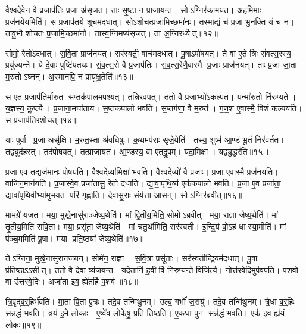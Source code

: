 वै॒श्व॒दे॒वेन॒ वै प्र॒जाप॑तिः प्र॒जा अ॑सृजत।
ताः सृ॒ष्टा न प्राजा॑यन्त।
सोऽग्निर॑कामयत।
अ॒हमि॒माः प्रज॑नयेय॒मिति॑।
स प्र॒जाप॑तये॒ शुच॑मदधात्।
सो॑ऽशोचत्प्र॒जामि॒च्छमा॑नः।
तस्मा॒द्यं च॑ प्र॒जा भु॒नक्ति॒ यं च॒ न।
तावु॒भौ शो॑चतः प्र॒जामि॒च्छमा॑नौ।
तास्व॒ग्निमप्य॑सृजत्।
ता अ॒ग्निरध्यैत्॥१२॥

सोमो॒ रेतो॑ऽदधात्।
स॒वि॒ता प्राज॑नयत्।
सर॑स्वती॒ वाच॑मदधात्।
पू॒षाऽपो॑षयत्।
ते वा ए॒ते त्रिः सं॑वत्स॒रस्य॒ प्रयु॑ज्यन्ते।
ये दे॒वाः पुष्टि॑पतयः।
सं॒व॒त्स॒रो वै प्र॒जाप॑तिः।
सं॒व॒त्स॒रेणै॒वास्मै प्र॒जाः प्राज॑नयत्।
ताः प्र॒जा जा॒ता म॒रुतोऽघ्नन्।
अ॒स्मानपि॒ न प्रायु॑क्ष॒तेति॑॥१३॥

स ए॒तं प्र॒जाप॑तिर्मारु॒त स॒प्तक॑पालमपश्यत्।
तन्निर॑वपत्।
ततो॒ वै प्र॒जाभ्यो॑ऽकल्पत।
यन्मा॑रु॒तो नि॑रु॒प्यते।
य॒ज्ञस्य॒ कॢप्त्यै।
प्र॒जाना॒मघा॑ताय।
स॒प्तक॑पालो भवति।
स॒प्तग॑णा॒ वै म॒रुत॑।
ग॒ण॒श ए॒वास्मै॒ विशं॑ कल्पयति।
स प्र॒जाप॑तिरशोचत्॥१४॥

याः पूर्वा प्र॒जा असृ॑क्षि।
म॒रुत॒स्ता अ॑वधिषुः।
क॒थमप॑राः सृजे॒येति॑।
तस्य॒ शुष्म॑ आ॒ण्डं भू॒तं निर॑वर्तत।
तद्व्युद॑हरत्।
तद॑पोषयत्।
तत्प्राजा॑यत।
आ॒ण्डस्य॒ वा ए॒तद्रू॒पम्।
यदा॒मिक्षा।
यद्व्यु॒द्धर॑ति॥१५॥

प्र॒जा ए॒व तद्यज॑मानः पोषयति।
वै॒श्व॒दे॒व्या॑मिक्षा॑ भवति।
वै॒श्व॒दे॒व्यो॑ वै प्र॒जाः।
प्र॒जा ए॒वास्मै॒ प्रज॑नयति।
वाजि॑न॒मान॑यति।
प्र॒जास्वे॒व प्रजा॑तासु॒ रेतो॑ दधाति।
द्या॒वा॒पृ॒थि॒व्य॑ एक॑कपालो भवति।
प्र॒जा ए॒व प्रजा॑ता॒ द्यावा॑पृथि॒वीभ्या॑मुभ॒यत॒ परि॑ गृह्णाति।
दे॒वा॒सु॒राः संय॑त्ता आसन्।
सोऽग्निर॑ब्रवीत्॥१६॥

मामग्रे॑ यजत।
मया॒ मुखे॒नासु॑राञ्जेष्य॒थेति॑।
मां द्वि॒तीय॒मिति॒ सोमोऽब्रवीत्।
मया॒ राज्ञा॑ जेष्य॒थेति॑।
मां तृ॒तीय॒मिति॑ सवि॒ता।
मया॒ प्रसू॑ता जेष्य॒थेति॑।
मां च॑तु॒र्थीमिति॒ सर॑स्वती।
इ॒न्द्रि॒यं वो॒ऽहं धास्या॒मीति॑।
मां प॑ञ्च॒ममिति॑ पू॒षा।
मया प्रति॒ष्ठया॑ जेष्य॒थेति॑॥१७॥

तेऽग्निना॒ मुखे॒नासु॑रानजयन्।
सोमे॑न॒ राज्ञा।
स॒वि॒त्रा प्रसू॑ताः।
सर॑स्वतीन्द्रि॒यम॑दधात्।
पू॒षा प्र॑ति॒ष्ठाऽऽसीत्।
ततो॒ वै दे॒वा व्य॑जयन्त।
यदे॒तानि॑ ह॒वीषि॑ निरु॒प्यन्ते॒ विजि॑त्यै।
नोत्त॑रवे॒दिमुप॑वपति।
प॒शवो॒ वा उ॑त्तरवे॒दिः।
अजा॑ता इव॒ ह्ये॑तर्\mbox{}हि॑ प॒शव॑॥१८॥\anuvakamend[ऐ॒दित्य॑शोचद्व्यु॒द्धर॑त्यब्रवीत्प्रति॒ष्ठया॑ जेष्य॒थेत्ये॒तर्\mbox{}हि॑ प॒शव॑]

त्रि॒वृद्ब॒र्॒हिर्भ॑वति।
मा॒ता पि॒ता पु॒त्रः।
तदे॒व तन्मि॑थु॒नम्।
उल्बं॒ गर्भो॑ ज॒रायु॑।
तदे॒व तन्मि॑थु॒नम्।
त्रे॒धा ब॒र्॒हिः सन्न॑द्धं भवति।
त्रय॑ इ॒मे लो॒काः।
ए॒ष्वे॑व लो॒केषु॒ प्रति॑ तिष्ठति।
ए॒क॒धा पुन॒ सन्न॑द्धं भवति।
एक॑ इव॒ ह्य॑यं लो॒कः॥१९॥


